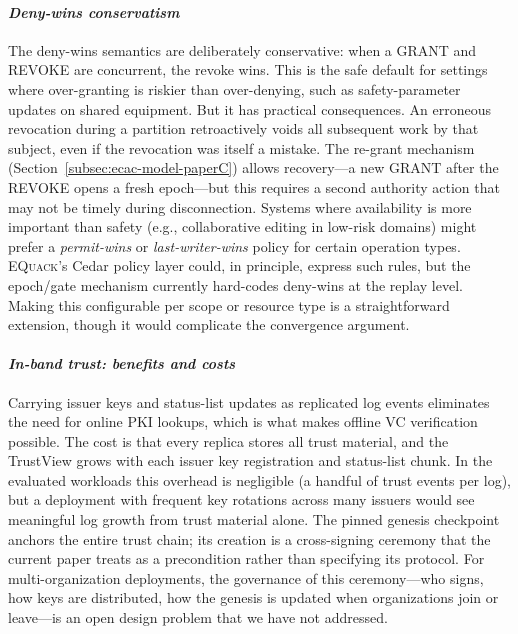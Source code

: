 \documentclass[10pt,journal,compsoc]{IEEEtran}
\newcommand{\equack}{\textsc{EQuack}}
\begin{document}
\paragraph*{\textit{Deny-wins conservatism}}
The deny-wins semantics are deliberately conservative: when a GRANT and REVOKE are concurrent, the revoke wins. This is the safe default for settings where over-granting is riskier than over-denying, such as safety-parameter updates on shared equipment. But it has practical consequences. An erroneous revocation during a partition retroactively voids all subsequent work by that subject, even if the revocation was itself a mistake. The re-grant mechanism (Section~\ref{subsec:ecac-model-paperC}) allows recovery---a new GRANT after the REVOKE opens a fresh epoch---but this requires a second authority action that may not be timely during disconnection. Systems where availability is more important than safety (e.g., collaborative editing in low-risk domains) might prefer a \emph{permit-wins} or \emph{last-writer-wins} policy for certain operation types. \equack{}'s Cedar policy layer could, in principle, express such rules, but the epoch/gate mechanism currently hard-codes deny-wins at the replay level. Making this configurable per scope or resource type is a straightforward extension, though it would complicate the convergence argument.

\paragraph*{\textit{In-band trust: benefits and costs}}
Carrying issuer keys and status-list updates as replicated log events eliminates the need for online PKI lookups, which is what makes offline VC verification possible. The cost is that every replica stores all trust material, and the TrustView grows with each issuer key registration and status-list chunk. In the evaluated workloads this overhead is negligible (a handful of trust events per log), but a deployment with frequent key rotations across many issuers would see meaningful log growth from trust material alone. The pinned genesis checkpoint anchors the entire trust chain; its creation is a cross-signing ceremony that the current paper treats as a precondition rather than specifying its protocol. For multi-organization deployments, the governance of this ceremony---who signs, how keys are distributed, how the genesis is updated when organizations join or leave---is an open design problem that we have not addressed.
\end{document}
